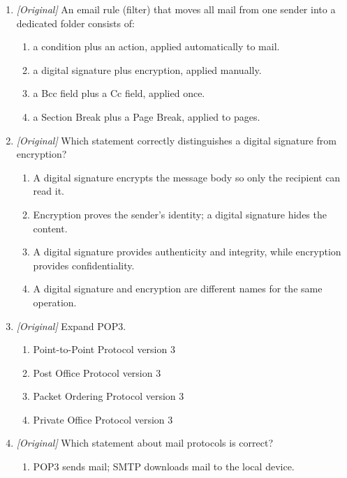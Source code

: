 \begin{enumerate}[label=\textbf{Q\arabic*.}, leftmargin=*]
\begin{enumerate}[label=\Alph*.]
    \item II only
    \item I, II, and III
    \item I and II only
  \end{enumerate}
\item \textit{[Original]} An email rule (filter) that moves all mail from one
  sender into a dedicated folder consists of:
  \begin{enumerate}[label=\Alph*.]
    \item a condition plus an action, applied automatically to mail.
    \item a digital signature plus encryption, applied manually.
    \item a Bcc field plus a Cc field, applied once.
    \item a Section Break plus a Page Break, applied to pages.
  \end{enumerate}
\item \textit{[Original]} Which statement correctly distinguishes a digital
  signature from encryption?
  \begin{enumerate}[label=\Alph*.]
    \item A digital signature encrypts the message body so only the recipient
      can read it.
    \item Encryption proves the sender's identity; a digital signature hides
      the content.
    \item A digital signature provides authenticity and integrity, while
      encryption provides confidentiality.
    \item A digital signature and encryption are different names for the same
      operation.
  \end{enumerate}
\item \textit{[Original]} Expand POP3.
  \begin{enumerate}[label=\Alph*.]
    \item Point-to-Point Protocol version 3
    \item Post Office Protocol version 3
    \item Packet Ordering Protocol version 3
    \item Private Office Protocol version 3
  \end{enumerate}
\item \textit{[Original]} Which statement about mail protocols is correct?
  \begin{enumerate}[label=\Alph*.]
    \item POP3 sends mail; SMTP downloads mail to the local device.

\end{enumerate}
\end{enumerate}
